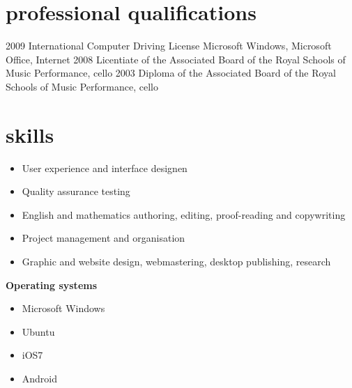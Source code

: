 \documentclass[]{friggeri-cv} %
\begin{document}

\section{professional qualifications}

\begin{entrylist}
\entry
{2009}
{International Computer Driving License}
{Microsoft Windows, Microsoft Office, Internet}
{}
\entry
{2008}
{Licentiate of the Associated Board of the Royal Schools of Music}
{Performance, cello}
{}
\entry
{2003}
{Diploma of the Associated Board of the Royal Schools of Music}
{Performance, cello}
{}
\end{entrylist}


\section{skills}

\begin{itemize}
\item User experience and interface designen
\item Quality assurance testing
\item English and mathematics authoring, editing, proof-reading and copywriting
\item Project management and organisation
\item Graphic and website design, webmastering, desktop publishing, research
\end{itemize}

\textbf{Operating systems}
\begin{multicols}{2}
\begin{itemize}
 \item Microsoft Windows
 \item Ubuntu
 \item iOS7
 \item Android
\end{itemize}
\end{multicols}
\end{document}
